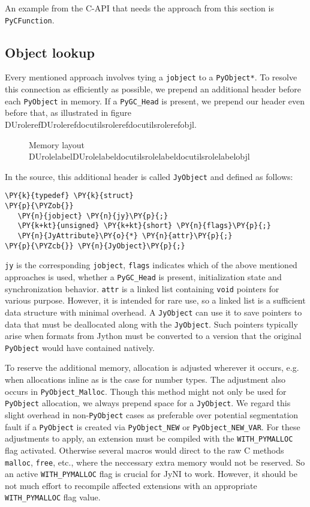 \documentclass[letterpaper,compsoc,twoside]{IEEEtran}
\makeatletter
\def\PY@reset{\let\PY@it=\relax \let\PY@bf=\relax \let\PY@ul=\relax \let\PY@tc=\relax \let\PY@bc=\relax \let\PY@ff=\relax}
\def\PY@tok#1{\csname PY@tok@#1\endcsname}
\def\PY@toks#1+{\ifx\relax#1\empty\else \PY@tok{#1}\expandafter\PY@toks\fi}
\def\PY@do#1{\PY@bc{\PY@tc{\PY@ul{\PY@it{\PY@bf{\PY@ff{#1}}}}}}}
\def\PY#1#2{\PY@reset\PY@toks#1+\relax+\PY@do{#2}}
\def\PYZob{\char`\{}
\def\PYZcb{\char`\}}
\providecommand*{\DUrole}[2]{\ifcsname DUrole#1\endcsname \csname DUrole#1\endcsname{#2}\else \ifcsname docutilsrole#1\endcsname \csname docutilsrole#1\endcsname{#2}\else #2\fi \fi }
\makeatother
\begin{document}
An example from the C-API that needs the approach from this section is \texttt{PyCFunction}.

\subsection{Object lookup\label{object-lookup}}


Every mentioned approach involves tying a \texttt{jobject} to a \texttt{PyObject*}. To resolve this connection
as efficiently as possible, we prepend an additional header before each \texttt{PyObject} in memory.
If a \texttt{PyGC\_Head} is present, we prepend our header even before that, as illustrated in figure \DUrole{ref}{objl}.\begin{figure}[]\noindent{}
\caption{Memory layout \DUrole{label}{objl}}
\end{figure}

In the source, this additional header is called \texttt{JyObject} and defined as follows:\begin{Verbatim}[commandchars=\\\{\},fontsize=\footnotesize]
\PY{k}{typedef} \PY{k}{struct}
\PY{p}{\PYZob{}}
   \PY{n}{jobject} \PY{n}{jy}\PY{p}{;}
   \PY{k+kt}{unsigned} \PY{k+kt}{short} \PY{n}{flags}\PY{p}{;}
   \PY{n}{JyAttribute}\PY{o}{*} \PY{n}{attr}\PY{p}{;}
\PY{p}{\PYZcb{}} \PY{n}{JyObject}\PY{p}{;}
\end{Verbatim}
\texttt{jy} is the corresponding \texttt{jobject}, \texttt{flags} indicates which of the above mentioned approaches is used, whether a \texttt{PyGC\_Head} is present, initialization state and synchronization behavior.
\texttt{attr} is a linked list containing \texttt{void} pointers for various purpose. However, it
is intended for rare use, so a linked list is a sufficient data structure with minimal overhead. A \texttt{JyObject} can use it to save pointers to data that must be deallocated along with the \texttt{JyObject}. Such pointers typically arise when formats from Jython must be converted to a version that the original
\texttt{PyObject} would have contained natively.

To reserve the additional memory, allocation is adjusted wherever it occurs, e.g. when allocations inline as is the case for number types. The adjustment also occurs in \texttt{PyObject\_Malloc}. Though this method might not only be used for \texttt{PyObject} allocation, we always prepend space for a \texttt{JyObject}. We regard this slight overhead in non-\texttt{PyObject} cases as preferable over potential segmentation fault if a \texttt{PyObject} is created via \texttt{PyObject\_NEW} or \texttt{PyObject\_NEW\_VAR}.
For these adjustments to apply, an extension must be compiled with the \texttt{WITH\_PYMALLOC} flag activated.
Otherwise several macros would direct to the raw C methods \texttt{malloc}, \texttt{free}, etc., where the neccessary
extra memory would not be reserved. So an active \texttt{WITH\_PYMALLOC} flag is crucial for JyNI to work.
However, it should be not much effort to recompile affected extensions with an appropriate \texttt{WITH\_PYMALLOC} flag value.
\end{document}
